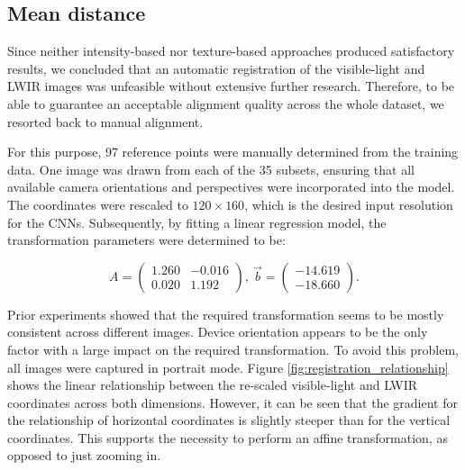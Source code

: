 \documentclass{l4proj}
\begin{document}
\subsection{Mean distance}
\label{mean_distance}

Since neither intensity-based nor texture-based approaches produced satisfactory results, we concluded that an automatic registration of the visible-light and LWIR images was unfeasible without extensive further research. Therefore, to be able to guarantee an acceptable alignment quality across the whole dataset, we resorted back to manual alignment.

For this purpose, 97 reference points were manually determined from the training data. One image was drawn from each of the 35 subsets, ensuring that all available camera orientations and perspectives were incorporated into the model. The coordinates were rescaled to $120 \times 160$, which is the desired input resolution for the CNNs. Subsequently, by fitting a linear regression model, the transformation parameters were determined to be: 

\begin{equation}
  A = \begin{pmatrix}
    1.260 & -0.016  \\
    0.020 & 1.192
  \end{pmatrix}, \ 
  \vec{b} = \begin{pmatrix}
    -14.619  \\
    -18.660
  \end{pmatrix}.
  \label{trans}
\end{equation}

Prior experiments showed that the required transformation seems to be mostly consistent across different images. Device orientation appears to be the only factor with a large impact on the required transformation. To avoid this problem, all images were captured in portrait mode. Figure \ref{fig:registration_relationship} shows the linear relationship between the re-scaled visible-light and LWIR coordinates across both dimensions. However, it can be seen that the gradient for the relationship of horizontal coordinates is slightly steeper than for the vertical coordinates. This supports the necessity to perform an affine transformation, as opposed to just zooming in.
\end{document}
